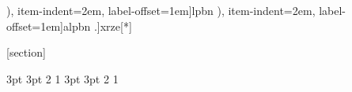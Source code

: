 \usepackage{mathtools,extarrows,amsfonts,amssymb,bm,mathrsfs} %
\usepackage{amsthm} %
\DeclareMathOperator{\rad}{rad}
\newcommand\me{\mathrm{e}}
\newcommand\imag{\mathrm{i}}
\newcommand\C{\mathbb{C}}
\newcommand\R{\mathbb{R}}
\newcommand\Q{\mathbb{Q}}
\newcommand\Z{\mathbb{Z}}
\newcommand\N{\mathbb{N}}
\renewcommand\Re{\mathrm{Re\,}}
\renewcommand\Im{\mathrm{Im\,}}
\newcommand{\dint}{\displaystyle\int}
\newcommand{\diff}{\,\mathrm{d}}
\usepackage{tasks}
\NewTasks[counter-format=(tsk[1]), item-indent=2em, label-offset=1em]{lpbn}
\NewTasks[counter-format=(tsk[a]), item-indent=2em, label-offset=1em]{alpbn}
\NewTasks[counter-format=tsk[A].]{xrze}[*]

\usepackage[a4paper,left=2.5cm,right=2.5cm,top=2.5cm,bottom=2cm]{geometry} %
\setlength{\headheight}{13pt}
\usepackage{fancyhdr} %
\pagestyle{fancy}
\fancyhf{}
\fancyhead[OL]{\fangsong \rightmark}
\fancyhead[ER]{\fangsong \leftmark}
\fancyhead[OR,EL]{\thepage}

\usepackage{array,diagbox,booktabs,tabularx} %
\usepackage[shortlabels]{enumitem} %



\usepackage{nameref}
\usepackage{prettyref}
\usepackage[colorlinks, linkcolor=Sumire]{hyperref}
\usepackage{graphicx}

\usepackage{caption} %
\usepackage{subfig} %

[section]
\renewcommand{\theFA}{\thesection.\arabic{FA}}

{3pt}%
{3pt}%
{}%
{2\ccwd}%
{\bfseries}%
{}%
{1\ccwd}%
{}%
{3pt}%
{3pt}%
{\kaishu}%
{2\ccwd}%
{\bfseries}%
{}%
{1\ccwd}%
{}%

\theoremstyle{normal}
\newtheorem{Thm}[FA]{定理}
\newtheorem{Thmn}{定理}
\renewcommand{\theThmn}{\theFA$'$}

\newtheorem{Lemma}[FA]{引理}
\newtheorem*{Prf}{证明}
\newtheorem{Rmk}[FA]{注}
\newtheorem*{Solve}{解}
\newtheorem{Def}[FA]{定义}
\newtheorem{Defn}{定义}
\renewcommand{\theDefn}{\thefA$'$}
\newtheorem{Cor}[FA]{推论}
\newtheorem{Ex}[FA]{例}
\newtheorem{Prop}[FA]{命题}


\newcommand{\abs}[1]{\ensuremath{\left| \,#1\, \right| }}
\newcommand{\lrangle}[1]{\langle #1 \rangle}
\newcommand{\degree}{\ensuremath{^{\circ}}}
\newcommand{\bs}{\backslash}
\newcommand{\baro}{\overline}
